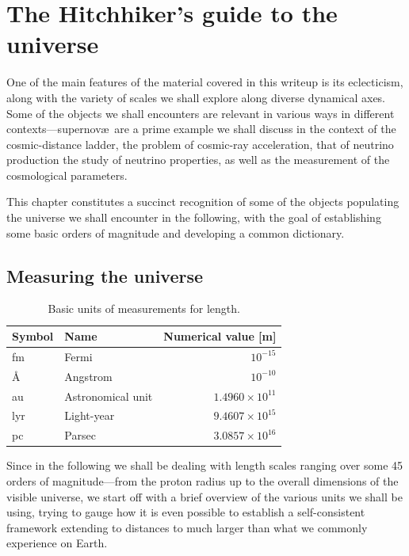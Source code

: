 \chapter{The Hitchhiker's guide to the universe}
\label{chap:universe}


One of the main features of the material covered in this writeup is its eclecticism,
along with the variety of scales we shall explore along diverse dynamical axes.
Some of the objects we shall encounters are relevant in various ways in different
contexts---supernov\ae~are a prime example we shall discuss in the context of the
cosmic-distance ladder, the problem of cosmic-ray acceleration, that of neutrino
production the study of neutrino properties, as well as the measurement of the
cosmological parameters.

This chapter constitutes a succinct recognition of some of the objects populating
the universe we shall encounter in the following, with the goal of establishing
some basic orders of magnitude and developing a common dictionary.


\section{Measuring the universe}\label{sec:cosmic_ladder}

\begin{table}[htb!]
  \caption{Basic units of measurements for length.}
  \label{tab:length_units}
  \begin{tabular}{llr}
    \hline
    Symbol & Name & Numerical value [m]\\
    \hline
    \hline
    fm & Fermi & $10^{-15}$\\
    \AA & Angstrom & $10^{-10}$\\
    au & Astronomical unit & $1.4960 \times 10^{11}$\\
    lyr & Light-year & $9.4607 \times 10^{15}$\\
    pc & Parsec & $3.0857 \times 10^{16}$\\
    \hline
  \end{tabular}
\end{table}

Since in the following we shall be dealing with length scales ranging over some
45 orders of magnitude---from the proton radius up to the overall dimensions of
the visible universe, we start off with a brief overview of the various units we
shall be using, trying to gauge how it is even possible to establish a self-consistent
framework extending to distances to much larger than what we commonly experience
on Earth.

